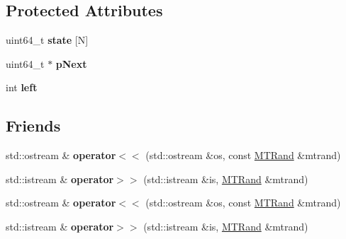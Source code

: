 \subsection*{Protected Attributes}
\begin{DoxyCompactItemize}
\item 
\hypertarget{classMTRand_a24d4eb2a8b096c57c131d9d68966672c}{uint64\-\_\-t {\bfseries state} \mbox{[}N\mbox{]}}\label{classMTRand_a24d4eb2a8b096c57c131d9d68966672c}

\item 
\hypertarget{classMTRand_aec7b7ae84fec0bbf75e853d3d90eae33}{uint64\-\_\-t $\ast$ {\bfseries p\-Next}}\label{classMTRand_aec7b7ae84fec0bbf75e853d3d90eae33}

\item 
\hypertarget{classMTRand_a98eabf568c88f121e44f487397f32495}{int {\bfseries left}}\label{classMTRand_a98eabf568c88f121e44f487397f32495}

\end{DoxyCompactItemize}
\subsection*{Friends}
\begin{DoxyCompactItemize}
\item 
\hypertarget{classMTRand_a059061d50a1e54ee3067d4e1dbdd7c64}{std\-::ostream \& {\bfseries operator$<$$<$} (std\-::ostream \&os, const \hyperlink{classMTRand}{M\-T\-Rand} \&mtrand)}\label{classMTRand_a059061d50a1e54ee3067d4e1dbdd7c64}

\item 
\hypertarget{classMTRand_a45b02a702835a3be42171c5c2dc79b2d}{std\-::istream \& {\bfseries operator$>$$>$} (std\-::istream \&is, \hyperlink{classMTRand}{M\-T\-Rand} \&mtrand)}\label{classMTRand_a45b02a702835a3be42171c5c2dc79b2d}

\item 
\hypertarget{classMTRand_a059061d50a1e54ee3067d4e1dbdd7c64}{std\-::ostream \& {\bfseries operator$<$$<$} (std\-::ostream \&os, const \hyperlink{classMTRand}{M\-T\-Rand} \&mtrand)}\label{classMTRand_a059061d50a1e54ee3067d4e1dbdd7c64}

\item 
\hypertarget{classMTRand_a45b02a702835a3be42171c5c2dc79b2d}{std\-::istream \& {\bfseries operator$>$$>$} (std\-::istream \&is, \hyperlink{classMTRand}{M\-T\-Rand} \&mtrand)}\label{classMTRand_a45b02a702835a3be42171c5c2dc79b2d}

\end{DoxyCompactItemize}


